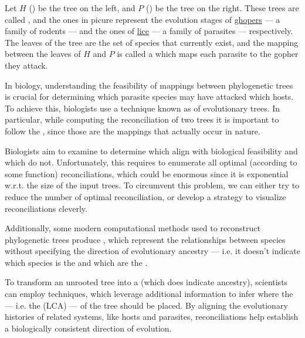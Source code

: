 \documentclass[a4paper, 12pt]{report}
\begin{document}

    Let $H$ () be the tree on the left, and $P$ () be the tree on the right. These trees are called , and the ones in picure represent the evolution stages of \href{https://en.wikipedia.org/wiki/Gopher}{ghopers} --- a family of rodents --- and the ones of \href{https://en.wikipedia.org/wiki/Louse}{lice} --- a family of parasites --- respectively. The leaves of the tree are the set of species that currently exist, and the mapping between the leaves of $H$ and $P$ is called a  which maps each parasite to the gopher they attack.

    In biology, understanding the feasibility of mappings between phylogenetic trees is crucial for determining which parasite species may have attacked which hosts. To achieve this, biologists use a technique known as  of evolutionary trees. In particular, while computing the reconciliation of two trees it is important to follow the , since those are the mappings that actually occur in nature.

    Biologists aim to examine  to determine which align with biological feasibility and which do not. Unfortunately, this requires to enumerate all optimal (according to some  function) reconciliations, which could be enormous since it is exponential w.r.t. the size of the input trees. To circumvent this problem, we can either try to reduce the number of optimal reconciliation, or develop a strategy to visualize reconciliations cleverly.

    Additionally, some modern computational methods used to reconstruct phylogenetic trees produce , which represent the relationships between species without specifying the direction of evolutionary ancestry --- i.e. it doesn't indicate which species is the  and which are the .

    To transform an unrooted tree into a  (which does indicate ancestry), scientists can employ  techniques, which leverage additional information to infer where the  --- i.e. the  (LCA) --- of the tree should be placed. By aligning the evolutionary histories of related systems, like hosts and parasites, reconciliations help establish a biologically consistent direction of evolution.
\end{document}

